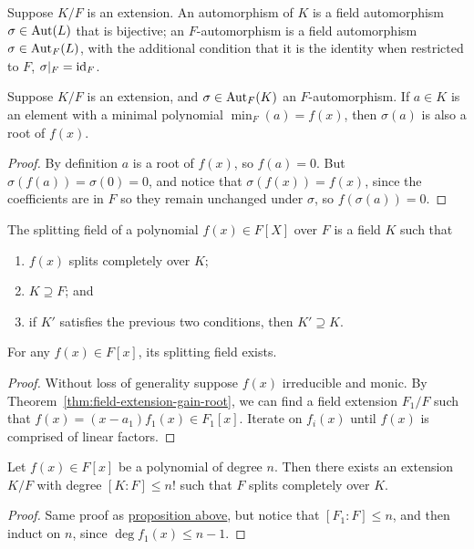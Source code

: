\begin{definition}
    Suppose \(K/F\) is an extension.
    An automorphism of \(K\) is a field automorphism \(\sigma \in \operatorname{Aut}(L)\)
    that is bijective;
    an \(F\)-automorphism is a field automorphism \(\sigma \in \operatorname{Aut}_F(L)\),
    with the additional condition that it is the identity when restricted to \(F\),
    \(\sigma\vert_F = \operatorname{id}_F\).
\end{definition}
\begin{lemma}
    Suppose \(K/F\) is an extension,
    and \(\sigma \in \operatorname{Aut}_F(K)\) an \(F\)-automorphism.
    If \(a \in K\) is an element with a minimal polynomial \(\min_F(a) = f(x)\),
    then \(\sigma(a)\) is also a root of \(f(x)\).
\end{lemma}
\begin{proof}
    By definition \(a\) is a root of \(f(x)\), so \(f(a) = 0\).
    But \(\sigma(f(a)) = \sigma(0) = 0\),
    and notice that \(\sigma(f(x)) = f(x)\),
    since the coefficients are in \(F\) so they remain unchanged under \(\sigma\),
    so \(f(\sigma(a)) = 0\).
\end{proof}

\begin{definition}
    The splitting field of a polynomial \(f(x) \in F[X]\) over \(F\)
    is a field \(K\) such that
    \begin{enumerate}[label={(\roman*)}, itemsep=0mm]
        \item \(f(x)\) splits completely over \(K\);
        \item \(K \supseteq F\); and
        \item if \(K'\) satisfies the previous two conditions,
            then \(K' \supseteq K\).
    \end{enumerate}
\end{definition}
\begin{proposition}\label{prop:splitting-field-existence}
    For any \(f(x) \in F[x]\), its splitting field exists.
\end{proposition}
\begin{proof}
    Without loss of generality suppose \(f(x)\) irreducible and monic.
    By Theorem~\ref{thm:field-extension-gain-root},
    we can find a field extension \(F_1/F\)
    such that \(f(x) = (x-a_1)f_1(x) \in F_1[x]\).
    Iterate on \(f_i(x)\) until \(f(x)\) is comprised of linear factors.
\end{proof}
\begin{corollary}
    Let \(f(x) \in F[x]\) be a polynomial of degree \(n\).
    Then there exists an extension \(K/F\) with degree \([K:F] \leq n!\)
    such that \(F\) splits completely over \(K\).
\end{corollary}
\begin{proof}
    Same proof as \hyperref[prop:splitting-field-existence]{proposition above},
    but notice that \([F_1:F] \leq n\),
    and then induct on \(n\), since \(\deg f_1(x) \leq n-1\).
\end{proof}

